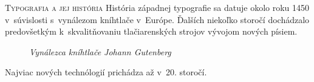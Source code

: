 \documentclass[xcolor=dvipsnames]{beamer}
\begin{document}
\begin{frame}{\textsc{\large{Typografia a jej história}}}
		História západnej typografie sa datuje okolo roku 1450 v~súvislosti s~vynálezom kníhtlače v~Európe. Ďalších niekoľko storočí dochádzalo predovšetkým k~skvalitňovaniu tlačiarenských strojov vývojom nových písiem.
	\bigskip
	\begin{figure}[ht]
		\begin{center}
   			\caption{\textit{Vynálezca kníhtlače Johann Gutenberg}}
		\end{center}
	\end{figure}
	Najviac nových technólogií prichádza až v~20. storočí.
\end{frame}
\end{document}

